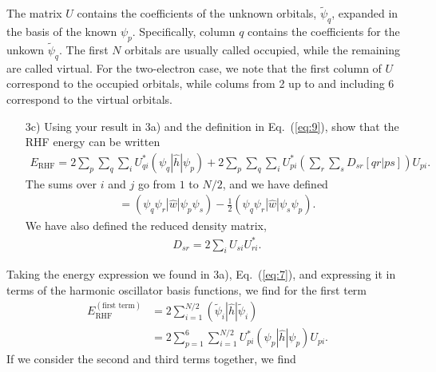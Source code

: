 \documentclass[a4paper]{article}
\newcommand{\eq} [1]{Eq.\ (\ref{eq:#1})}
\newcommand{\nn}{\nonumber}
\begin{document}
The matrix $U$ contains the coefficients of the unknown orbitals, $\tilde \psi_q$, expanded in the basis of the known $\psi_p$. Specifically, column $q$ contains the coefficients for the unkown $\tilde\psi_q$. The first $N$ orbitals are usually called occupied, while the remaining are called virtual. For the two-electron case, we note that the first column of $U$ correspond to the occupied orbitals, while colums from 2 up to and including 6 correspond to the virtual orbitals.

\begin{exframe}
\begin{itemize}
  \item[3c)] Using your result in 3a) and the definition in \eq{9}, show that the RHF energy can be written 
  \begin{align}
  E_\text{RHF} = 2\sum_p\sum_q\sum_i U^*_{qi} (\psi_q|\hat{h}|\psi_p) + 2\sum_p\sum_q\sum_i U^*_{pi} \left(\sum_r\sum_s D_{sr} [qr|ps]\right)U_{pi}. \label{eq:10}
  \end{align}
  The sums over $i$ and $j$ go from $1$ to $N/2$, and we have defined 
  \begin{align}
  [qr|ps] = (\psi_q\psi_r|\hat{w}|\psi_p\psi_s) - \frac{1}{2}(\psi_q\psi_r|\hat{w}|\psi_s\psi_p). 
  \end{align}
  We have also defined the reduced density matrix,
  \begin{align}
  D_{sr} = 2\sum_i U_{si}U^*_{ri}.
  \end{align}
\end{itemize}
\end{exframe}
Taking the energy expression we found in 3a), \eq{7}, and expressing it in terms of the harmonic oscillator basis functions, we find for the first term 
\begin{align}
E_\text{RHF}^{(\text{first term})} &= 2\sum_{i=1}^{N/2} (\tilde{\psi}_i | \hat{h} | \tilde{\psi}_i) \nn\\
&= 2\sum_{p=1}^6 \sum_{i=1}^{N/2} U^*_{pi}({\psi}_p | \hat{h} | {\psi}_p)U_{pi}.
\end{align}
If we consider the second and third terms together, we find
\end{document}
